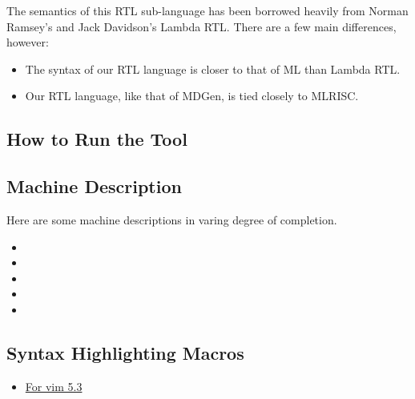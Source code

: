    The semantics of this RTL sub-language has been borrowed heavily from
Norman Ramsey's and Jack Davidson's Lambda RTL.  There
are a few main differences, however: 
\begin{itemize}
  \item The syntax of our RTL language 
        is closer to that of ML than Lambda RTL.  
  \item Our RTL language, like that of MDGen, is tied closely to MLRISC.
\end{itemize}

\subsection{How to Run the Tool}

\subsection{Machine Description}
Here are some machine descriptions in varing degree of completion.

\begin{itemize}
 \item {} 
 \item {} 
 \item {}
 \item {} 
 \item {} 
\end{itemize}

\subsection{ Syntax Highlighting Macros }

\begin{itemize}
  \item \href{md.vim}{For vim 5.3}
\end{itemize}
